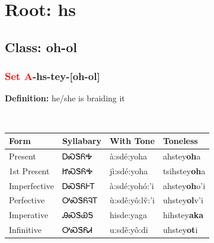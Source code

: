 \needspace{4in}
\section*{Root: hs}
\nopagebreak
{}
\needspace{3in}
\subsection*{Class: oh-ol}
\nopagebreak
\needspace{2in}
\subsubsection*{\textcolor{Red}{Set A}{-}\textbf{hs}{-}tey{-}[oh-ol]}
\nopagebreak
\textbf{Definition: } he/she is braiding it
\\[0.5em]
\begin{tabularx}{\textwidth}{l X X X}%
\toprule%
\textbf{Form}&\textbf{Syllabary}&\textbf{With Tone}&\textbf{Toneless}\\%
\midrule%
Present&ᎠᏍᏕᏲᎭ&à:sdé:yoha&ahstey\textbf{oh}a\\%
1st Present&ᏥᏍᏕᏲᎭ&jì:sdé:yoha&tsihstey\textbf{oh}a\\%
Imperfective&ᎠᏍᏕᏲᎰᎢ&à:sdé:yohó:’i&ahstey\textbf{oh}o'i\\%
Perfective&ᎤᏍᏕᏲᎸᎢ&ù:sdě:yô:lv̌:’i&uhstey\textbf{ol}v'i\\%
Imperative&ᎯᏍᏕᏯᎦ&hisde:yaga&hihstey\textbf{aka}\\%
Infinitive&ᎤᏍᏕᏲᏗ&u:sdě:yô:di&uhstey\textbf{ot}i\\%
\bottomrule%
\end{tabularx}
\\[1em]